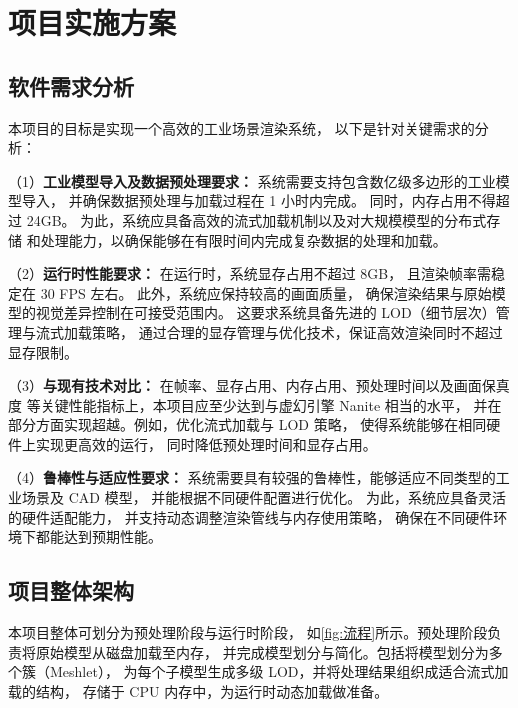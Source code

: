 \cleardoublepage

\section{项目实施方案}

\subsection{软件需求分析}

本项目的目标是实现一个高效的工业场景渲染系统，
以下是针对关键需求的分析：

\par （1）\textbf{工业模型导入及数据预处理要求：}  
系统需要支持包含数亿级多边形的工业模型导入，
并确保数据预处理与加载过程在 1 小时内完成。
同时，内存占用不得超过 24GB。
为此，系统应具备高效的流式加载机制以及对大规模模型的分布式存储
和处理能力，以确保能够在有限时间内完成复杂数据的处理和加载。

\par （2）\textbf{运行时性能要求：}  
在运行时，系统显存占用不超过 8GB，
且渲染帧率需稳定在 30 FPS 左右。
此外，系统应保持较高的画面质量，
确保渲染结果与原始模型的视觉差异控制在可接受范围内。
这要求系统具备先进的 LOD（细节层次）管理与流式加载策略，
通过合理的显存管理与优化技术，保证高效渲染同时不超过显存限制。

\par （3）\textbf{与现有技术对比：}  
在帧率、显存占用、内存占用、预处理时间以及画面保真度
等关键性能指标上，本项目应至少达到与虚幻引擎 Nanite 相当的水平，
并在部分方面实现超越。例如，优化流式加载与 LOD 策略，
使得系统能够在相同硬件上实现更高效的运行，
同时降低预处理时间和显存占用。

\par （4）\textbf{鲁棒性与适应性要求：}  
系统需要具有较强的鲁棒性，能够适应不同类型的工业场景及 CAD 模型，
并能根据不同硬件配置进行优化。
为此，系统应具备灵活的硬件适配能力，
并支持动态调整渲染管线与内存使用策略，
确保在不同硬件环境下都能达到预期性能。

\subsection{项目整体架构}

\par 本项目整体可划分为预处理阶段与运行时阶段，  
如\autoref{fig:流程}所示。预处理阶段负责将原始模型从磁盘加载至内存，  
并完成模型划分与简化。包括将模型划分为多个簇（Meshlet），  
为每个子模型生成多级 LOD，并将处理结果组织成适合流式加载的结构，  
存储于 CPU 内存中，为运行时动态加载做准备。

